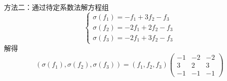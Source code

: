 \begin{enumerate}
\begin{enumerate}
                    方法二：通过待定系数法解方程组
                    \[ \begin{cases}
                            \sigma(f_1) = -f_1 + 3 f_2 - f_3   \\
                            \sigma(f_2) = -2 f_1 + 2 f_2 - f_3 \\
                            \sigma(f_3) = -2 f_1 + 3 f_2 - f_3
                        \end{cases} \]
                    解得
                    \[ (\sigma(f_1), \sigma(f_2), \sigma(f_3)) = (f_1, f_2, f_3) \begin{pmatrix}
                            -1 & -2 & -2 \\
                            3  & 2  & 3  \\
                            -1 & -1 & -1
                        \end{pmatrix} \]


\end{enumerate}
\end{enumerate}
